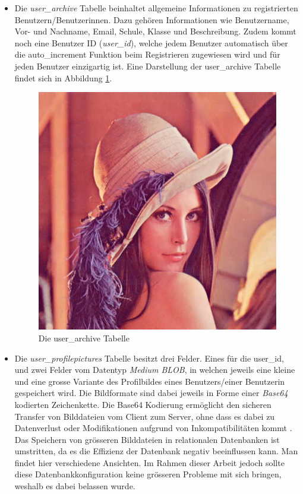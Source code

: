 \documentclass[../main.tex]{subfiles}
\begin{document}
	\begin{itemize}
		\item Die \emph{user\_archive} Tabelle beinhaltet allgemeine Informationen zu registrierten Benutzern/Benutzerinnen. Dazu gehören Informationen wie Benutzername, Vor- und Nachname, Email, Schule, Klasse und Beschreibung. Zudem kommt noch eine Benutzer ID (\emph{user\_id}), welche jedem Benutzer automatisch über die auto\_increment Funktion beim Registrieren zugewiesen wird und für jeden Benutzer einzigartig ist. Eine Darstellung der user\_archive Tabelle findet sich in Abbildung \ref{user_archive}.
		\begin{figure} 
			\centering
			\includegraphics[width=\textwidth, height=0.5\textheight]{./images/lena.jpg}
			\caption{Die user\_archive Tabelle}
			\label{user_archive}
		\end{figure}
		\item Die \emph{user\_profilepictures} Tabelle besitzt drei Felder. Eines für die user\_id, und zwei Felder vom Datentyp \emph{Medium BLOB}, in welchen jeweils eine kleine und eine grosse Variante des Profilbildes eines Benutzers/einer Benutzerin gespeichert wird. Die Bildformate sind dabei jeweils in Forme einer \emph{Base64} kodierten Zeichenkette. Die Base64 Kodierung ermöglicht den sicheren Transfer von Bilddateien vom Client zum Server, ohne dass es dabei zu Datenverlust oder Modifikationen aufgrund von Inkompatibilitäten kommt \cite{base64}. Das Speichern von grösseren Bilddateien in relationalen Datenbanken ist umstritten, da es die Effizienz der Datenbank negativ beeinflussen kann. Man findet hier verschiedene Ansichten. Im Rahmen dieser Arbeit jedoch sollte diese Datenbankkonfiguration keine grösseren Probleme mit sich bringen, weshalb es dabei belassen wurde.

\end{itemize}
\end{document}
